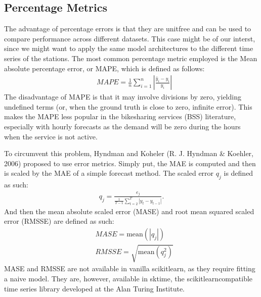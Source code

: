 \documentclass[letterpaper,10pt,english]{jupyterBook}
\begin{document}
\subsection{Percentage Metrics}
\label{\detokenize{06-forecasting:percentage-metrics}}
\sphinxAtStartPar
The advantage of percentage errors is that they are unit\sphinxhyphen{}free and can be used to compare performance across different datasets. This case might be of our interst, since we might want to apply the same model architectures to the different time series of the stations. The most common percentage metric employed is the Mean absolute percentage error, or MAPE, which is defined as follows:
\label{equation:06-forecasting:dac7b920-6bd3-42e5-b359-577e052dd67d}\begin{align}
&MAPE= \frac{1}{n}\sum_{i=1}^{n}\left\vert \frac{\hat{y}_{i}-y_{i}}{y_{i}}\right\vert
\end{align}
\sphinxAtStartPar
The disadvantage of MAPE is that it may involve divisions by zero, yielding undefined terms (or, when the ground truth is close to zero, infinite error). This makes the MAPE less popular in the bike\sphinxhyphen{}sharing services (BSS) literature, especially with hourly forecasts as the demand will be zero during the hours when the service is not active.

\sphinxAtStartPar
To circumvent this problem, Hyndman and Koheler (R. J. Hyndman \& Koehler, 2006) proposed to use  error metrics. Simply put, the MAE is computed and then is scaled by the  MAE of a simple forecast method. The scaled error \(q_j\) is defined as such:
\label{equation:06-forecasting:3f804e78-13b2-4c43-99f4-45e7532df4de}\begin{align}
q_{j} = \frac{\displaystyle e_{j}}
    {\displaystyle\frac{1}{T-1}\sum_{t=2}^T |y_{t}-y_{t-1}|}.
\end{align}
\sphinxAtStartPar
And then the mean absolute scaled error (MASE) and root mean squared scaled error (RMSSE) are defined as such:
\label{equation:06-forecasting:21f64f6f-597d-4ae4-912b-64936f7b252f}\begin{align}
& MASE = \text{mean}(|q_{j}|) \\
& RMSSE = \sqrt{\text{mean}(q_{j}^2)}
\end{align}
\sphinxAtStartPar
MASE and RMSSE are not available in vanilla scikit\sphinxhyphen{}learn, as they require fitting a naive model. They are, however, available in sktime, the scikit\sphinxhyphen{}learn\sphinxhyphen{}compatible time series library developed at the Alan Turing Institute.
\end{document}
